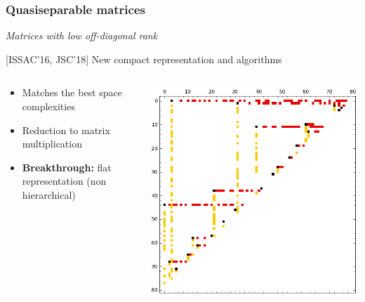 \documentclass{beamer}
\begin{document}
\begin{frame}
  \frametitle{Quasiseparable matrices }
  \begin{center}
    \textit{Matrices with low off-diagonal rank}
  \end{center}

  \begin{block}
    {[ISSAC'16, JSC'18] New compact representation and algorithms}
  \begin{columns}
    \begin{column}{.75\textwidth}
    \begin{itemize}
    \item Matches the best space complexities%
    \item Reduction to matrix multiplication%
    \item \textbf{Breakthrough:} flat representation (non hierarchical)
    \end{itemize}
    \end{column}
    \begin{column}{.2\textwidth}
      \includegraphics[width=\textwidth]{Bruhat}
    \end{column}
  \end{columns}
  \end{block}

\end{frame}
\end{document}
